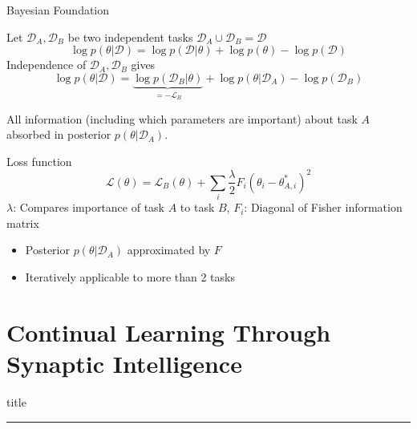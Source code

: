 \documentclass{beamer}
\begin{document}
\begin{frame}{Bayesian Foundation}

Let $\mathcal D_A, \mathcal D_B$ be two \textcolor{oxfordblue}{independent} tasks $\mathcal D_A \cup \mathcal D_B = \mathcal D$%
\\
\begin{equation}
\log p(\theta|\mathcal D) = \log p(\mathcal D|\theta) + \log p (\theta) - \log p(\mathcal D)
\end{equation}
Independence of $\mathcal D_A, \mathcal D_B$ gives 
\begin{equation}
\log p(\theta|\mathcal D) = \underbrace{\log p(\mathcal D_B|\theta)}_{=- \mathcal L_B} + \log p(\theta|\mathcal D_A) - \log p(\mathcal D_B)
\end{equation}

All information (including which parameters are important) about task $A$ absorbed in posterior $p(\theta|\mathcal D_A)$.
\end{frame}
\begin{frame}{Loss function}
	\begin{equation}
	\mathcal L(\theta) = \mathcal L_B(\theta) + \sum_i \frac{\lambda}{2} F_i (\theta_i - \theta_{A,i}^*)^2
	\end{equation}
	$\lambda$: Compares importance of task $A$ to task $B$, $F_i$: Diagonal of Fisher information matrix
	\begin{itemize}
		\item<2-> Posterior $p(\theta|\mathcal D_A)$ approximated by $F$
		\item<3-> Iteratively applicable to more than 2 tasks
	\end{itemize}	
\end{frame}
\section{Continual Learning Through Synaptic Intelligence}
    \begin{frame}[plain]
        \vfill
      \centering
      \begin{beamercolorbox}[sep=8pt,center,shadow=true,rounded=true]{title}
        \insertsectionhead\par%
        \color{oxfordblue}\noindent\rule{10cm}{1pt}
      \end{beamercolorbox}
      \vfill
  \end{frame}
  
\end{document}

